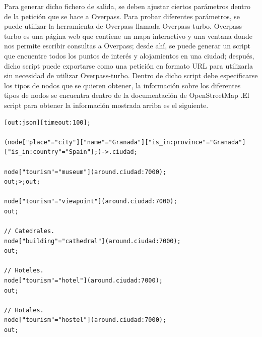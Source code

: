 Para generar dicho fichero de salida, se deben ajustar ciertos parámetros dentro de la petición que se hace a Overpass. Para probar diferentes parámetros, se puede utilizar la herramienta de Overpass llamada Overpass-turbo.\newline
Overpass-turbo es una página web que contiene un mapa interactivo y una ventana donde nos permite escribir consultas a Overpass; desde ahí, se puede generar un script que encuentre todos los puntos de interés y alojamientos en una ciudad; después, dicho script puede exportarse como una petición en formato URL para utilizarla sin necesidad de utilizar Overpass-turbo. Dentro de dicho script debe especificarse los tipos de nodos que se quieren obtener, la información sobre los diferentes tipos de nodos se encuentra dentro de la documentación de OpenStreetMap \cite{openstreetmap_doc}.El script para obtener la información mostrada arriba es el siguiente. \newline
\begin{lstlisting}[caption=Script para encontrar todos los puntos de interés y alojamientos de una ciudad]
[out:json][timeout:100]; 

(node["place"="city"]["name"="Granada"]["is_in:province"="Granada"]["is_in:country"="Spain"];)->.ciudad; 

node["tourism"="museum"](around.ciudad:7000);
out;>;out;

node["tourism"="viewpoint"](around.ciudad:7000);
out;

// Catedrales.
node["building"="cathedral"](around.ciudad:7000);
out;

// Hoteles.
node["tourism"="hotel"](around.ciudad:7000);
out;

// Hotales.
node["tourism"="hostel"](around.ciudad:7000);
out;
\end{lstlisting}

